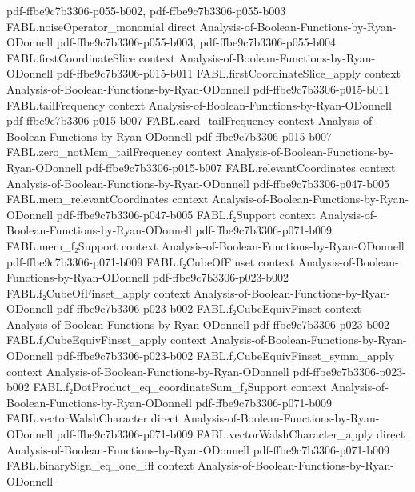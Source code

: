 \begin{theorem}
  {pdf-ffbe9c7b3306-p055-b002,
    pdf-ffbe9c7b3306-p055-b003}
\proofstep
  {FABL.noiseOperator_monomial}
  {direct}
  {Analysis-of-Boolean-Functions-by-Ryan-ODonnell}
  {pdf-ffbe9c7b3306-p055-b003,
    pdf-ffbe9c7b3306-p055-b004}
\proofstep
  {FABL.firstCoordinateSlice}
  {context}
  {Analysis-of-Boolean-Functions-by-Ryan-ODonnell}
  {pdf-ffbe9c7b3306-p015-b011}
\proofstep
  {FABL.firstCoordinateSlice_apply}
  {context}
  {Analysis-of-Boolean-Functions-by-Ryan-ODonnell}
  {pdf-ffbe9c7b3306-p015-b011}
\proofstep
  {FABL.tailFrequency}
  {context}
  {Analysis-of-Boolean-Functions-by-Ryan-ODonnell}
  {pdf-ffbe9c7b3306-p015-b007}
\proofstep
  {FABL.card_tailFrequency}
  {context}
  {Analysis-of-Boolean-Functions-by-Ryan-ODonnell}
  {pdf-ffbe9c7b3306-p015-b007}
\proofstep
  {FABL.zero_notMem_tailFrequency}
  {context}
  {Analysis-of-Boolean-Functions-by-Ryan-ODonnell}
  {pdf-ffbe9c7b3306-p015-b007}
\proofstep
  {FABL.relevantCoordinates}
  {context}
  {Analysis-of-Boolean-Functions-by-Ryan-ODonnell}
  {pdf-ffbe9c7b3306-p047-b005}
\proofstep
  {FABL.mem_relevantCoordinates}
  {context}
  {Analysis-of-Boolean-Functions-by-Ryan-ODonnell}
  {pdf-ffbe9c7b3306-p047-b005}
\proofstep
  {FABL.f₂Support}
  {context}
  {Analysis-of-Boolean-Functions-by-Ryan-ODonnell}
  {pdf-ffbe9c7b3306-p071-b009}
\proofstep
  {FABL.mem_f₂Support}
  {context}
  {Analysis-of-Boolean-Functions-by-Ryan-ODonnell}
  {pdf-ffbe9c7b3306-p071-b009}
\proofstep
  {FABL.f₂CubeOfFinset}
  {context}
  {Analysis-of-Boolean-Functions-by-Ryan-ODonnell}
  {pdf-ffbe9c7b3306-p023-b002}
\proofstep
  {FABL.f₂CubeOfFinset_apply}
  {context}
  {Analysis-of-Boolean-Functions-by-Ryan-ODonnell}
  {pdf-ffbe9c7b3306-p023-b002}
\proofstep
  {FABL.f₂CubeEquivFinset}
  {context}
  {Analysis-of-Boolean-Functions-by-Ryan-ODonnell}
  {pdf-ffbe9c7b3306-p023-b002}
\proofstep
  {FABL.f₂CubeEquivFinset_apply}
  {context}
  {Analysis-of-Boolean-Functions-by-Ryan-ODonnell}
  {pdf-ffbe9c7b3306-p023-b002}
\proofstep
  {FABL.f₂CubeEquivFinset_symm_apply}
  {context}
  {Analysis-of-Boolean-Functions-by-Ryan-ODonnell}
  {pdf-ffbe9c7b3306-p023-b002}
\proofstep
  {FABL.f₂DotProduct_eq_coordinateSum_f₂Support}
  {context}
  {Analysis-of-Boolean-Functions-by-Ryan-ODonnell}
  {pdf-ffbe9c7b3306-p071-b009}
\proofstep
  {FABL.vectorWalshCharacter}
  {direct}
  {Analysis-of-Boolean-Functions-by-Ryan-ODonnell}
  {pdf-ffbe9c7b3306-p071-b009}
\proofstep
  {FABL.vectorWalshCharacter_apply}
  {direct}
  {Analysis-of-Boolean-Functions-by-Ryan-ODonnell}
  {pdf-ffbe9c7b3306-p071-b009}
\proofstep
  {FABL.binarySign_eq_one_iff}
  {context}
  {Analysis-of-Boolean-Functions-by-Ryan-ODonnell}

\end{theorem}
